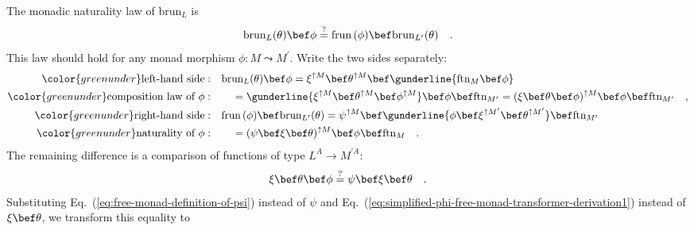 The monadic naturality law of $\text{brun}_{L}$ is
\[
\text{brun}_{L}(\theta)\bef\phi\overset{?}{=}\text{frun}\,(\phi)\bef\text{brun}_{L^{\prime}}(\theta)\quad.
\]
This law should hold for any monad morphism $\phi:M\leadsto M^{\prime}$.
Write the two sides separately:
\begin{align*}
{\color{greenunder}\text{left-hand side}:}\quad & \text{brun}_{L}(\theta)\bef\phi=\xi^{\uparrow M}\bef\theta^{\uparrow M}\bef\gunderline{\text{ftn}_{M}\bef\phi}\\
{\color{greenunder}\text{composition law of }\phi:}\quad & \quad=\gunderline{\xi^{\uparrow M}\bef\theta^{\uparrow M}\bef\phi^{\uparrow M}}\bef\phi\bef\text{ftn}_{M^{\prime}}=(\xi\bef\theta\bef\phi)^{\uparrow M}\bef\phi\bef\text{ftn}_{M^{\prime}}\quad,\\
{\color{greenunder}\text{right-hand side}:}\quad & \text{frun}\,(\phi)\bef\text{brun}_{L^{\prime}}(\theta)=\psi^{\uparrow M}\bef\gunderline{\phi\bef\xi^{\uparrow M^{\prime}}\bef\theta^{\uparrow M^{\prime}}}\bef\text{ftn}_{M^{\prime}}\\
{\color{greenunder}\text{naturality of }\phi:}\quad & \quad=(\psi\bef\xi\bef\theta)^{\uparrow M}\bef\phi\bef\text{ftn}_{M}\quad.
\end{align*}
The remaining difference is a comparison of functions of type $L^{A}\rightarrow M^{\prime A}$:
\begin{equation}
\xi\bef\theta\bef\phi\overset{?}{=}\psi\bef\xi\bef\theta\quad.\label{eq:monadic-naturality-free-monad-transformer-derivation1}
\end{equation}
Substituting Eq.~(\ref{eq:free-monad-definition-of-psi}) instead
of $\psi$ and Eq.~(\ref{eq:simplified-phi-free-monad-transformer-derivation1})
instead of $\xi\bef\theta$, we transform this equality to
